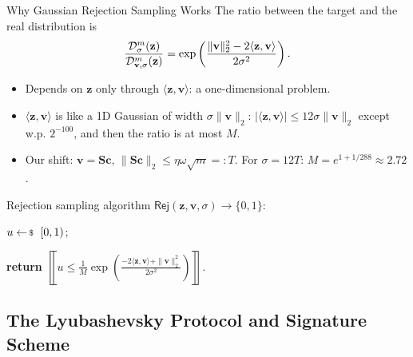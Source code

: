 \documentclass{zkdl-presentation-template}
\begin{document}
    \begin{frame}{Why Gaussian Rejection Sampling Works}
        The ratio between the target and the real distribution is
        \begin{equation*}
            \frac{\mathcal{D}^m_{\sigma}(\mathbf{z})}{\mathcal{D}^m_{\mathbf{v},\sigma}(\mathbf{z})} = \exp\left(\frac{\|\mathbf{v}\|_2^2 - 2\langle \mathbf{z},\mathbf{v} \rangle}{2\sigma^2}\right).
        \end{equation*}
        \vspace{-10pt}
        \begin{itemize}
            \item Depends on $\mathbf{z}$ only through $\langle \mathbf{z}, \mathbf{v} \rangle$: a one-dimensional problem.\pause
            \item $\langle \mathbf{z}, \mathbf{v} \rangle$ is like a 1D Gaussian of width $\sigma\|\mathbf{v}\|_2$: $|\langle \mathbf{z}, \mathbf{v} \rangle| \leq 12\sigma\|\mathbf{v}\|_2$ except w.p. $2^{-100}$, and then the ratio is at most $M$.\pause
            \item Our shift: $\mathbf{v} = \mathbf{S}\mathbf{c}$, $\|\mathbf{S}\mathbf{c}\|_2 \leq \eta\omega\sqrt{m} =: T$. For $\sigma = 12T$: $M = e^{1+1/288} \approx 2.72$.
        \end{itemize}
        \pause

        \begin{block}{Rejection sampling algorithm}
            \colorbox{oc-blue-1}{$\mathsf{Rej}(\mathbf{z}, \mathbf{v}, \sigma) \to \{0,1\}$:}
            \begin{algoen}
                \item $u \leftarrowS [0,1)$;
                \item \textbf{return} $\left\llbracket u \leq \frac{1}{M}\exp\left(\frac{-2\langle \mathbf{z},\mathbf{v} \rangle + \|\mathbf{v}\|_2^2}{2\sigma^2}\right) \right\rrbracket$. 
            \end{algoen}
        \end{block}
    \end{frame}

    \subsection{The Lyubashevsky Protocol and Signature Scheme}
\end{document}
